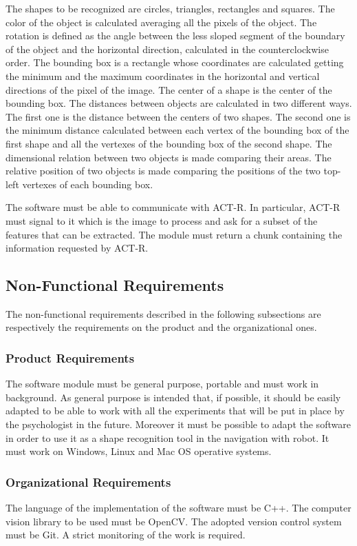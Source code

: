 		The shapes to be recognized are circles, triangles, rectangles and squares. 
		The color of the object is calculated averaging all the pixels of the object.
		The rotation is defined as the angle between the less sloped segment of the boundary of the object and the horizontal direction, calculated in the counterclockwise order.
		The bounding box is a rectangle whose coordinates are calculated getting the minimum and the maximum coordinates in the horizontal and vertical directions of the pixel of the image. 
		The center of a shape is the center of the bounding box.
		The distances between objects are calculated in two different ways. The first one is the distance between the centers of two shapes. The second one is the minimum distance calculated between each vertex of the bounding box of the first shape and all the vertexes of the bounding box of the second shape.
		The dimensional relation between two objects is made comparing their areas. 
		The relative position of two objects is made comparing the positions of the two top-left vertexes of each bounding box.

		The software must be able to communicate with ACT-R. 
		In particular, ACT-R must signal to it which is the image to process and ask for a subset of the features that can be extracted. The module must return a chunk containing the information requested by ACT-R.

		\subsection{Non-Functional Requirements}
		The non-functional requirements described in the following subsections are respectively the requirements on the product and the organizational ones.

			\subsubsection{Product Requirements}
			The software module must be general purpose, portable and must work in background.
			As general purpose is intended that, if possible, it should be easily adapted to be able to work with all the experiments that will be put in place by the psychologist in the future. Moreover it must be possible to adapt the software in order to use it as a shape recognition tool in the navigation with robot. %
			It must work on Windows, Linux and Mac OS operative systems.
	
			\subsubsection{Organizational Requirements}
			The language of the implementation of the software must be C++. 
			The computer vision library to be used must be OpenCV.
			The adopted version control system must be Git.
			A strict monitoring of the work is required.





